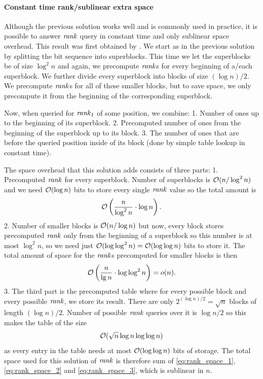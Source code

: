 \paragraph{Constant time rank/sublinear extra space}

Although the previous solution works well and is commonly used in practice, it is possible to
answer $\mathit{rank}$ query in constant time and only sublinear space overhead. This result was first
obtained by \cite{okanohara2007practical}. We start as in the previous solution by splitting
the bit sequence into superblocks. This time we let the superblocks be of size $\log^2 n$
and again, we precompute $\mathit{rank}$s for every beginning of a/each superblock. We further divide every
superblock into blocks of size $(\log n)/2$. We precompute $\mathit{rank}$s for all of these
smaller blocks, but to save space, we only precompute it from the beginning of the corresponding
superblock.

Now, when queried for $\mathit{rank}_1$ of some position, we combine:
1. Number of ones up to the beginning of its superblock.
2. Precomputed number of ones from the beginning of the superblock up to its block.
3. The number of ones that are before the queried position inside of its block (done by simple
table lookup in constant time).

The space overhead that this solution adds consists of three parts:
1. Precomputed $\mathit{rank}$ for every
superblock. Number of superblocks is $\mathcal{O}(n/\log^2 n)$ and we need $\mathcal{O}(\log n)$ bits to store every
single $\mathit{rank}$ value so the total amount is
\begin{equation}
    \mathcal{O}\left(\frac{n}{\log^2 n}\cdot \log n\right).
    \label{eq:rank_space_1}
\end{equation}
2. Number of smaller blocks is $\mathcal{O}(n/\log n)$ but now, every block stores precomputed $\mathit{rank}$ only from the
beginning of a superblock so this number is at most $\log^2 n$, so we need just $\mathcal{O}(\log\log^2 n)=\mathcal{O}(\log\log n)$
bits to store it. The total amount of space for the $\mathit{rank}$s precomputed for smaller blocks is then
\begin{equation}
    \mathcal{O}\left(\frac{n}{\lg n}\cdot \log\log^2 n\right)=o(n).
    \label{eq:rank_space_2}
\end{equation}
3. The third part is the precomputed table where for every possible block and every
possible $\mathit{rank}$, we store its result. There are only $2^{(\log n)/2} = \sqrt{n}$ blocks of length 
$(\log n)/2$. Number of possible $\mathit{rank}$ queries over it is $\log n/2$ so this makes the table of the size
\begin{equation}
    \mathcal{O}(\sqrt{n}\log n\log\log n)
    \label{eq:rank_space_3}
\end{equation}
as every entry in the table needs at most $\mathcal{O}(\log\log n)$ bits of storage. The total space used for
this solution of $\mathit{rank}$ is therefore sum of \ref{eq:rank_space_1}, \ref{eq:rank_space_2} and
\ref{eq:rank_space_3}, which is sublinear in $n$.

